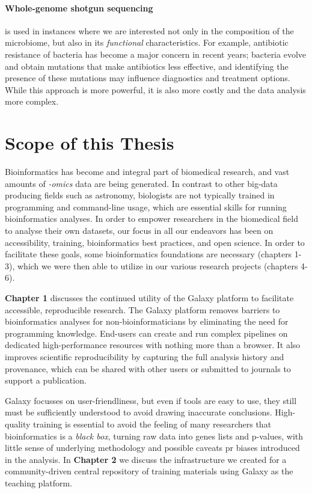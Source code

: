 \begin{justify}
\paragraph{Whole-genome shotgun sequencing} is used in instances where we are interested not only in the composition of the microbiome, but also in its \emph{functional} characteristics. For example, antibiotic resistance of bacteria has become a major concern in recent years; bacteria evolve and obtain mutations that make antibiotics less effective, and identifying the presence of these mutations may influence diagnostics and treatment options. While this approach is more powerful, it is also more costly and the data analysis more complex.


\section{Scope of this Thesis}

Bioinformatics has become and integral part of biomedical research, and vast amounts of \emph{-omics} data are being generated. In contrast to other big-data producing fields such as astronomy, biologists are not typically trained in programming and command-line usage, which are essential skills for running bioinformatics analyses. In order to empower researchers in the biomedical field to analyse their own datasets, our focus in all our endeavors has been on accessibility, training, bioinformatics best practices, and open science. In order to facilitate these goals, some bioinformatics foundations are necessary (chapters 1-3), which we were then able to utilize in our various research projects (chapters 4-6).

\textbf{Chapter 1} discusses the continued utility of the Galaxy platform to facilitate accessible, reproducible research. The Galaxy platform removes barriers to bioinformatics analyses for non-bioinformaticians by eliminating the need for programming knowledge. End-users can create and run complex pipelines on dedicated high-performance resources with nothing more than a browser. It also improves scientific reproducibility by capturing the full analysis history and provenance, which can be shared with other users or submitted to journals to support a publication.

Galaxy focusses on user-friendliness, but even if tools are easy to use, they still must be sufficiently understood to avoid drawing inaccurate conclusions. High-quality training is essential to avoid the feeling of many researchers that bioinformatics is a \emph{black box}, turning raw data into genes lists and p-values, with little sense of underlying methodology and possible caveats pr biases introduced in the analysis. In \textbf{Chapter 2} we discuss the infrastructure we created for a community-driven central repository of training materials using Galaxy as the teaching platform.


\end{justify}
